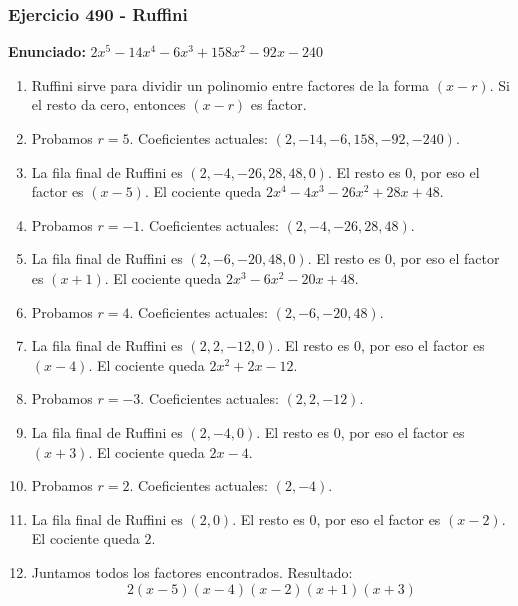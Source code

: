 \documentclass[11pt,a4paper]{article}
\begin{document}
\subsubsection*{Ejercicio 490 - Ruffini}
\textbf{Enunciado:} $ 2 x^{5} - 14 x^{4} - 6 x^{3} + 158 x^{2} - 92 x - 240 $\par
\begin{enumerate}[leftmargin=2em]
\item Ruffini sirve para dividir un polinomio entre factores de la forma \((x-r)\). Si el resto da cero, entonces \((x-r)\) es factor.
\item Probamos \(r=5\). Coeficientes actuales: \((2, -14, -6, 158, -92, -240)\).
\item La fila final de Ruffini es \((2, -4, -26, 28, 48, 0)\). El resto es \(0\), por eso el factor es \((x-5)\). El cociente queda \(2 x^{4} - 4 x^{3} - 26 x^{2} + 28 x + 48\).
\item Probamos \(r=-1\). Coeficientes actuales: \((2, -4, -26, 28, 48)\).
\item La fila final de Ruffini es \((2, -6, -20, 48, 0)\). El resto es \(0\), por eso el factor es \((x+1)\). El cociente queda \(2 x^{3} - 6 x^{2} - 20 x + 48\).
\item Probamos \(r=4\). Coeficientes actuales: \((2, -6, -20, 48)\).
\item La fila final de Ruffini es \((2, 2, -12, 0)\). El resto es \(0\), por eso el factor es \((x-4)\). El cociente queda \(2 x^{2} + 2 x - 12\).
\item Probamos \(r=-3\). Coeficientes actuales: \((2, 2, -12)\).
\item La fila final de Ruffini es \((2, -4, 0)\). El resto es \(0\), por eso el factor es \((x+3)\). El cociente queda \(2 x - 4\).
\item Probamos \(r=2\). Coeficientes actuales: \((2, -4)\).
\item La fila final de Ruffini es \((2, 0)\). El resto es \(0\), por eso el factor es \((x-2)\). El cociente queda \(2\).
\item Juntamos todos los factores encontrados. Resultado: \[\boxed{2 \left(x - 5\right) \left(x - 4\right) \left(x - 2\right) \left(x + 1\right) \left(x + 3\right)}\]
\end{enumerate}

\vspace{0.2cm}
\end{document}
